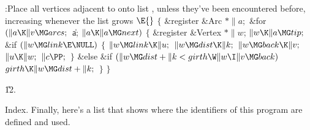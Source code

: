\B{}:Place all vertices adjacent to  onto list , unless
they've been encountered before, increasing  whenever the list grows%
\X${}\E{}$\6
${}\{{}$\5
\1\&{register} \&{Arc} ${}{*}\|a;{}$\7
\&{for} ${}(\|a\K\|v\MG\\{arcs};{}$ \|a; ${}\|a\K\|a\MG\\{next}){}$\5
${}\{{}$\5
\1\&{register} \&{Vertex} ${}{*}\|w{}$;\7
${}\|w\K\|a\MG\\{tip};{}$\6
\&{if} ${}(\|w\MG\\{link}\E\NULL){}$\5
${}\{{}$\1\6
${}\|w\MG\\{link}\K\|u;{}$\6
${}\|w\MG\\{dist}\K\|k;{}$\6
${}\|w\MG\\{back}\K\|v;{}$\6
${}\|u\K\|w;{}$\6
${}\|c\PP;{}$\6
\4${}\}{}$\5
\2\&{else} \&{if} ${}(\|w\MG\\{dist}+\|k<\\{girth}\W\|w\I\|v\MG\\{back}){}$\1\5
${}\\{girth}\K\|w\MG\\{dist}+\|k;{}$\2\6
\4${}\}{}$\2\6
\4${}\}{}$\2\par
\U12.\fi

Index. Finally, here's a list that shows where the identifiers of this
program are defined and used.

\fi


\inx
\fin
\con
